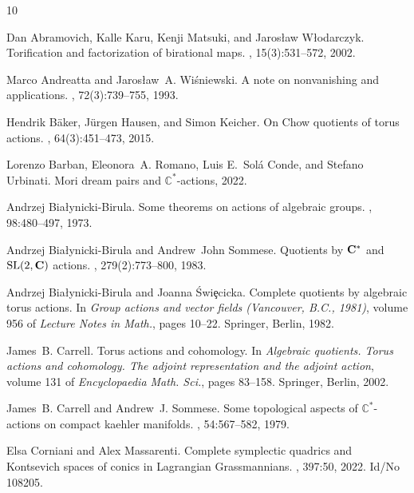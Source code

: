 \documentclass[10pt,a4paper]{article}
\numberwithin{equation}{section}
\theoremstyle{definition}
\theoremstyle{remark}
\begin{document}
\begin{thebibliography}{10}

Dan Abramovich, Kalle Karu, Kenji Matsuki, and Jaros{\l}aw W{\l}odarczyk.
\newblock Torification and factorization of birational maps.
, 15(3):531--572, 2002.

Marco Andreatta and Jaros{\l}aw~A. Wi\'{s}niewski.
\newblock A note on nonvanishing and applications.
, 72(3):739--755, 1993.

Hendrik B\"{a}ker, J\"{u}rgen Hausen, and Simon Keicher.
\newblock On {C}how quotients of torus actions.
, 64(3):451--473, 2015.

Lorenzo Barban, Eleonora~A. Romano, Luis E.~Sol\'a Conde, and Stefano Urbinati.
\newblock Mori dream pairs and $\mathbb{C}^*$-actions, 2022.

Andrzej Bia{\l}ynicki-Birula.
\newblock Some theorems on actions of algebraic groups.
, 98:480--497, 1973.

Andrzej Bia{\l}ynicki-Birula and Andrew~John Sommese.
\newblock Quotients by {${\bf C}\sp{\ast} $} and {${\rm SL}(2,{\bf C})$}
  actions.
, 279(2):773--800, 1983.

Andrzej Bia{\l}ynicki-Birula and Joanna \'Swi{\c e}cicka.
\newblock Complete quotients by algebraic torus actions.
\newblock In {\em Group actions and vector fields ({V}ancouver, {B}.{C}.,
  1981)}, volume 956 of {\em Lecture Notes in Math.}, pages 10--22. Springer,
  Berlin, 1982.

James~B. Carrell.
\newblock Torus actions and cohomology.
\newblock In {\em Algebraic quotients. {T}orus actions and cohomology. {T}he
  adjoint representation and the adjoint action}, volume 131 of {\em
  Encyclopaedia Math. Sci.}, pages 83--158. Springer, Berlin, 2002.

James~B. Carrell and Andrew~J. Sommese.
\newblock Some topological aspects of $\mathbb{C}^*$-actions on compact kaehler
  manifolds.
, 54:567--582, 1979.

Elsa Corniani and Alex Massarenti.
\newblock Complete symplectic quadrics and {Kontsevich} spaces of conics in
  {Lagrangian} {Grassmannians}.
, 397:50, 2022.
\newblock Id/No 108205.


\end{thebibliography}
\end{document}
